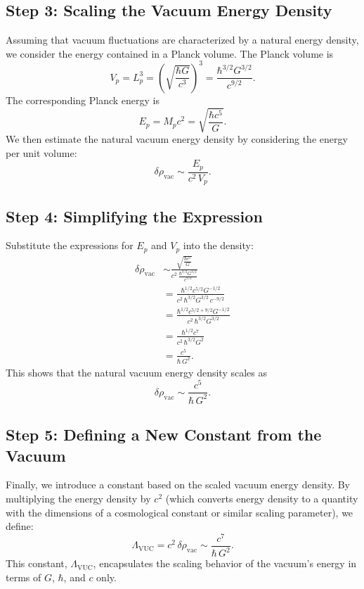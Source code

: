 \documentclass[12pt]{article}
\begin{document}
\subsection{Step 3: Scaling the Vacuum Energy Density}
Assuming that vacuum fluctuations are characterized by a natural energy density, we consider the energy contained in a Planck volume. The Planck volume is
\[
V_p = L_p^3 = \left(\sqrt{\frac{\hbar G}{c^3}}\right)^3 = \frac{\hbar^{3/2} G^{3/2}}{c^{9/2}}.
\]
The corresponding Planck energy is
\[
E_p = M_p c^2 = \sqrt{\frac{\hbar c^5}{G}}.
\]
We then estimate the natural vacuum energy density by considering the energy per unit volume:
\[
\delta \rho_{\text{vac}} \sim \frac{E_p}{c^2\,V_p}.
\]

\subsection{Step 4: Simplifying the Expression}
Substitute the expressions for \(E_p\) and \(V_p\) into the density:
\begin{align*}
\delta \rho_{\text{vac}} &\sim \frac{\sqrt{\frac{\hbar c^5}{G}}}{c^2 \, \frac{\hbar^{3/2} G^{3/2}}{c^{9/2}}} \\
&= \frac{\hbar^{1/2} c^{5/2} G^{-1/2}}{c^2\, \hbar^{3/2} G^{3/2} \, c^{-9/2}} \\
&= \frac{\hbar^{1/2} c^{5/2+9/2} G^{-1/2}}{c^2\, \hbar^{3/2} G^{3/2}} \\
&= \frac{\hbar^{1/2} c^7}{c^2\, \hbar^{3/2} G^{2}} \\
&= \frac{c^5}{\hbar\, G^2}.
\end{align*}
This shows that the natural vacuum energy density scales as
\[
\delta \rho_{\text{vac}} \sim \frac{c^5}{\hbar\, G^2}.
\]

\subsection{Step 5: Defining a New Constant from the Vacuum}
Finally, we introduce a constant based on the scaled vacuum energy density. By multiplying the energy density by \(c^2\) (which converts energy density to a quantity with the dimensions of a cosmological constant or similar scaling parameter), we define:
\[
\Lambda_{\text{VUC}} = c^2\, \delta \rho_{\text{vac}} \sim \frac{c^7}{\hbar\, G^2}.
\]
This constant, \(\Lambda_{\text{VUC}}\), encapsulates the scaling behavior of the vacuum’s energy in terms of \(G\), \(\hbar\), and \(c\) only.
\end{document}
